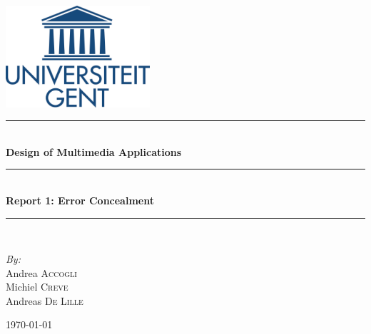 \documentclass[a4paper,11pt]{article}
\newcommand{\HRule}{\rule{\linewidth}{0.5mm}}
\begin{document}
\begin{titlepage}
\begin{center}

\includegraphics[width=0.4\textwidth]{./logo}~\\[1cm]

\HRule \\[0.4cm]
\huge \textbf{Design of Multimedia Applications}
\HRule \\[0.4cm]
{ \huge \bfseries Report 1: Error Concealment \\[0.4cm] }
\HRule \\[0.4cm]

\begin{minipage}{0.4\textwidth}
\begin{flushleft} \large
\emph{By:}\\
Andrea \textsc{Accogli}\\
Michiel \textsc{Creve}\\
Andreas \textsc{De Lille}\\
\end{flushleft}
\end{minipage}

\vfill

{\large \today}

\end{center}
\end{titlepage}

\tableofcontents

\newpage
{}
\setcounter{page}{1}













\end{document}
